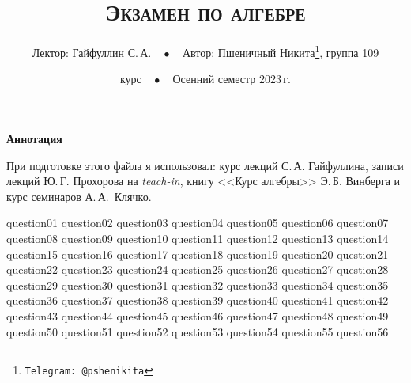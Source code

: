 \documentclass[a4paper, 10pt]{article}
\begin{document}
\title{\bfseries\scshape Экзамен по алгебре}
\author{Лектор: Гайфуллин С.\,А.$\quad\bullet\quad$Автор: Пшеничный Никита\thanks{\texttt{Telegram: @pshenikita}}, группа 109}
\date{ курс$\quad\bullet\quad$Осенний семестр 2023\,г.}

\maketitle

\begin{center}
    \textbf{\sffamily Аннотация}

    При подготовке этого файла я использовал: курс лекций С.\,А. Гайфуллина, записи лекций Ю.\,Г. Прохорова на \textit{teach-in}, книгу <<Курс алгебры>> Э.\,Б. Винберга и курс семинаров \mbox{А.\,А. Клячко}.
\end{center}

\tableofcontents

\newpage

{question01}
{question02}
{question03}
{question04}
{question05}
{question06}
{question07}
{question08}
{question09}
{question10}
{question11}
{question12}
{question13}
{question14}
{question15}
{question16}
{question17}
{question18}
{question19}
{question20}
{question21}
{question22}
{question23}
{question24}
{question25}
{question26}
{question27}
{question28}
{question29}
{question30}
{question31}
{question32}
{question33}
{question34}
{question35}
{question36}
{question37}
{question38}
{question39}
{question40}
{question41}
{question42}
{question43}
{question44}
{question45}
{question46}
{question47}
{question48}
{question49}
{question50}
{question51}
{question52}
{question53}
{question54}
{question55}
{question56}
\end{document}
